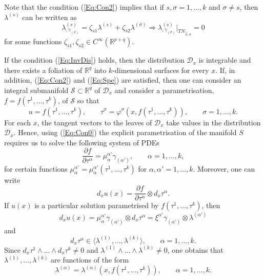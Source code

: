 \documentclass{birkjour}
\theoremstyle{definition}
\theoremstyle{remark}
\numberwithin{equation}{section}
\numberwithin{equation}{section}
\numberwithin{thm}{section}
\numberwithin{equation}{section}
\numberwithin{thm}{section}
\begin{document}
Note that the condition (\ref{Eq:Con2}) implies that if  $s,\sigma=1,\ldots,k$ and $\sigma\neq s$, then $\lambda^{(s)}$ can be written as 
\begin{equation}\label{Eq:PLS}
	\lambda^{(s)}_{,\gamma_{(\sigma)}}=\zeta_{s1}\lambda^{(s)}+\zeta_{s2}\lambda^{(\sigma)}\Rightarrow \lambda^{(s)}_{,\gamma_{(\sigma)}}|_{TN_{\vec{a},u}}=0
\end{equation}
for some functions $\zeta_{s1},\zeta_{s2}\in C^\infty(\mathbb{R}^{p+q})$.

If  the condition (\ref{Eq:InvDis}) holds, then the distribution $\mathcal{D}_x$ is integrable and there exists a foliation of $\mathbb{R}^q$ into $k$-dimensional surfaces for every $x$.  If, in addition, (\ref{Eq:Con2}) and (\ref{Eq:Spe}) are satisfied, then one can consider an integral submanifold $\mathcal{S}\subset \mathbb{R}^q$ of $\mathcal{D}_x$ and consider a parametrisation, $f=f(\tau^1,\ldots,\tau^k)$, of $\mathcal{S}$ so that 
\begin{equation}	\label{eq:speX}
	u=f(\tau^1,\ldots,\tau^{k}),\qquad \tau^\sigma=\varphi^\sigma(x,f(\tau^1,\ldots,\tau^k)),\qquad \sigma=1,\ldots,k.	
\end{equation}
For each $x$, the tangent vectors to the leaves of $\mathcal{D}_x$ take values in the distribution $\mathcal{D}_x$. Hence, using (\ref{Eq:Con0}) the explicit parametrisation of the manifold $S$ requires us to solve the following system of PDEs
\begin{equation}
	\label{Eq:Sur}
	\frac{\partial f}{\partial \tau^\alpha}=\mu_\alpha^{\alpha'}\gamma_{(\alpha')},\qquad \alpha=1,\ldots,k,
\end{equation}
for certain functions $\mu_\alpha^{\alpha'}=\mu^{\alpha'}_\alpha(\tau^1,\ldots,\tau^k)$ for $\alpha,\alpha'=1,\ldots,k$. Moreover, one can write
$$
d_xu(x)=\frac{\partial f}{\partial \tau^\alpha}\otimes d_x\tau^\alpha.
$$
If $u(x)$ is a particular solution parametrised by $f(\tau^1,\ldots,\tau^k)$, then
$$
d_xu(x)=\mu_\alpha^{\alpha'}\gamma_{(\alpha')}\otimes d_x\tau^\alpha=\xi^{\alpha'}\gamma_{(\alpha')}\otimes \lambda^{(\alpha')}
$$and
\begin{equation}\label{Eq:star}
	d_x\tau^\alpha\in \langle \lambda^{(1)},\ldots,\lambda^{(k)}\rangle,\qquad \alpha=1,\ldots,k.
\end{equation}
Since $d_x\tau^1\wedge\ldots\wedge d_x\tau^k\neq 0 $ and $\lambda^{(1)}\wedge\ldots\wedge \lambda^{(k)}\neq 0$,  one obtains that $\lambda^{(1)},\ldots,\lambda^{(k)}$ are functions of the form
\begin{equation}\label{Eq:LambdaAlpha}
	\lambda^{(\alpha)}=\lambda^{(\alpha)}(x,f(\tau^1,\ldots,\tau^k)),\qquad \alpha=1,\ldots,k.
\end{equation}
\end{document}
